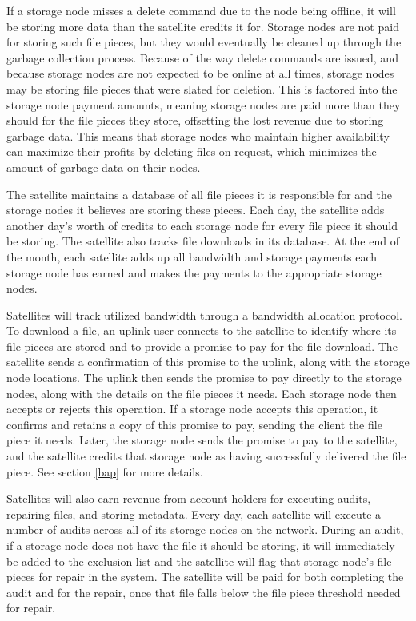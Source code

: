 \documentclass[11pt,fleqn,openany]{book}
\begin{document}
If a storage node misses a delete command due to the node being
offline, it will be storing more data than the satellite credits it for.
Storage nodes are not paid for storing such file pieces, but they
would eventually be cleaned up through the garbage collection process.
Because of the
way delete commands are issued, and because storage nodes are not expected to be
online at all times, storage nodes may be storing file pieces that were slated
for
deletion. This is factored into
the storage node payment amounts, meaning storage nodes are paid more than they
should for the file pieces they store, offsetting the lost revenue due to
storing garbage data.
This means that storage nodes who maintain higher availability
can maximize their profits by deleting files on request,
which minimizes the amount
of garbage data on their nodes.

The satellite maintains a database of all file pieces it is responsible for
and the storage nodes it believes are storing these pieces. Each day,
the satellite adds another day's worth
of credits to each storage node for every file
piece
it should be storing. The satellite
also tracks file downloads in its database.
At the end of the month, each satellite
adds up all bandwidth and storage payments each storage node has earned and
makes
the payments to the appropriate storage nodes.

Satellites will track utilized bandwidth through a bandwidth allocation
protocol. To download a file, an uplink user connects to the satellite to
identify where its file pieces are stored and to provide a promise to pay for
the file download. The satellite sends a confirmation of this promise
to the uplink, along with the storage node locations.
The uplink then sends the promise to pay directly
to the storage nodes, along with the details on the file pieces it needs.
Each storage node then accepts or rejects this operation.
If a storage node accepts this
operation, it confirms and retains a copy of this promise to pay, sending the
client the file piece it needs. Later, the storage node sends the promise to
pay to
the satellite, and the satellite credits that storage node as having
successfully delivered the file piece. See section \ref{bap} for more details.

Satellites will also earn revenue from account holders for executing audits,
repairing files, and storing metadata. Every day, each satellite will execute
a number of audits across all of its storage nodes on the network. During an
audit,
if a storage node does not have the file it should be storing, it will
immediately be added to the exclusion list and
the satellite will flag that storage node's file pieces for
repair
in the system.
The satellite will be paid for both completing the audit
and for the repair,
once that file falls below the file piece threshold needed for
repair.
\end{document}
